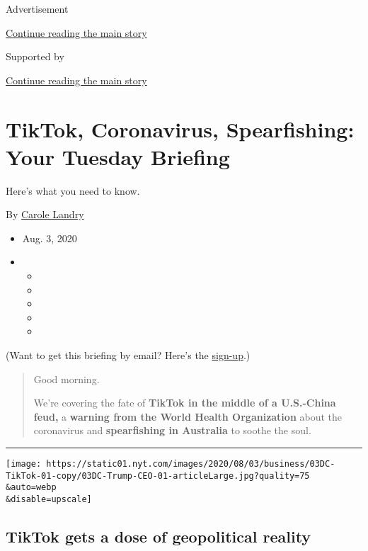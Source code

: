 Advertisement

\protect\hyperlink{after-top}{Continue reading the main story}

Supported by

\protect\hyperlink{after-sponsor}{Continue reading the main story}

\hypertarget{tiktok-coronavirus-spearfishing-your-tuesday-briefing}{%
\section{TikTok, Coronavirus, Spearfishing: Your Tuesday
Briefing}\label{tiktok-coronavirus-spearfishing-your-tuesday-briefing}}

Here's what you need to know.

By \href{https://www.nytimes.com/by/carole-landry}{Carole Landry}

\begin{itemize}
\item
  Aug. 3, 2020
\item
  \begin{itemize}
  \item
  \item
  \item
  \item
  \item
  \end{itemize}
\end{itemize}

(Want to get this briefing by email? Here's the
\href{https://www.nytimes.com/morning-briefing}{sign-up}.)

\begin{quote}
Good morning.

We're covering the fate of \textbf{TikTok in the middle of a U.S.-China
feud,} a \textbf{warning from the World Health Organization} about the
coronavirus and \textbf{spearfishing in Australia} to soothe the soul.
\end{quote}

\begin{center}\rule{0.5\linewidth}{\linethickness}\end{center}

\texttt{[image: https://static01.nyt.com/images/2020/08/03/business/03DC-TikTok-01-copy/03DC-Trump-CEO-01-articleLarge.jpg?quality=75\\\&auto=webp\\\&disable=upscale]}

\hypertarget{tiktok-gets-a-dose-of-geopolitical-reality}{%
\subsection{TikTok gets a dose of geopolitical
reality}\label{tiktok-gets-a-dose-of-geopolitical-reality}}


